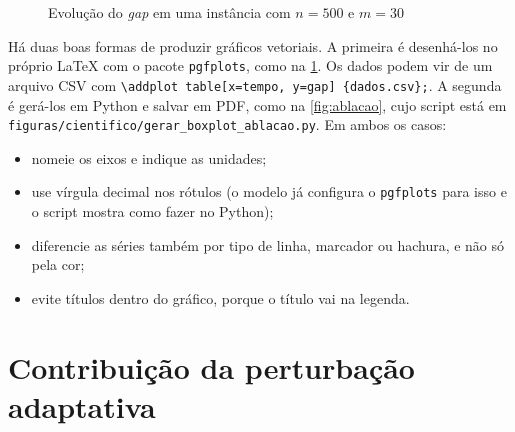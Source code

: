 \begin{figure}[htbp]
  \centering
  \caption{Evolução do \emph{gap} em uma instância com $n = 500$ e $m = 30$}
  \label{fig:convergencia}
  \fonteautor
\end{figure}

\begin{instrucao}
Há duas boas formas de produzir gráficos vetoriais. A primeira é desenhá-los
no próprio LaTeX com o pacote \verb|pgfplots|, como na
\cref{fig:convergencia}. Os dados podem vir de um arquivo CSV com
\verb|\addplot table[x=tempo, y=gap] {dados.csv};|. A segunda é gerá-los em
Python e salvar em PDF, como na \cref{fig:ablacao}, cujo script está em
\verb|figuras/cientifico/gerar_boxplot_ablacao.py|. Em ambos os casos:
\begin{itemize}
  \item nomeie os eixos e indique as unidades;
  \item use vírgula decimal nos rótulos (o modelo já configura o
        \verb|pgfplots| para isso e o script mostra como fazer no Python);
  \item diferencie as séries também por tipo de linha, marcador ou hachura, e
        não só pela cor;
  \item evite títulos dentro do gráfico, porque o título vai na legenda.
\end{itemize}
\end{instrucao}

\section{Contribuição da perturbação adaptativa}
\label{sec:experimentos:componentes}

